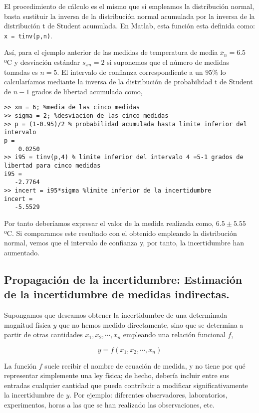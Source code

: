 El procedimiento de cálculo es el mismo que si empleamos la distribución normal, basta sustituir la inversa de la distribución normal acumulada por la inversa de la distribución t de Student acumulada. En Matlab, esta función esta definida como: \texttt{x = tinv(p,n)}. 

Así, para el ejemplo anterior de las medidas de temperatura de media  $\bar{x}_n=6.5$ ºC y  desviación estándar $s_{xn}=2$  si suponemos que el número de medidas tomadas es $n=5$. El intervalo de confianza correspondiente a un $95\%$  lo calcularíamos mediante la inversa de la distribución de probabilidad t de Student de $n-1$ grados de libertad acumulada como,

\begin{verbatim}
>> xm = 6; %media de las cinco medidas
>> sigma = 2; %desviacion de las cinco medidas
>> p = (1-0.95)/2 % probabilidad acumulada hasta limite inferior del intervalo
p =
    0.0250
>> i95 = tinv(p,4) % limite inferior del intervalo 4 =5-1 grados de libertad para cinco medidas
i95 =
   -2.7764
>> incert = i95*sigma %limite inferior de la incertidumbre
incert =
   -5.5529
\end{verbatim}

Por tanto deberíamos expresar el valor de la medida realizada como, $6.5\pm 5.55$ ºC. Si comparamos este resultado con el obtenido empleando la distribución normal, vemos que el intervalo de confianza y, por tanto, la incertidumbre han aumentado.

\subsection{Propagación de la incertidumbre: Estimación de la incertidumbre de medidas indirectas.}

Supongamos que deseamos obtener la incertidumbre de una determinada magnitud física $y$ que no hemos medido directamente, sino que se determina a partir de otras cantidades $x_1,x_2,\cdots,x_n$ empleando una relación funcional $f$,

\begin{equation*}
y = f(x_1,x_2,\cdots,x_n)
\end{equation*}

La función $f$ suele recibir el nombre de ecuación de medida, y no tiene por qué representar simplemente una ley física; de hecho, debería incluir entre sus entradas cualquier cantidad que pueda contribuir a modificar significativamente la incertidumbre de $y$. Por ejemplo: diferentes observadores, laboratorios, experimentos, horas a las que se han realizado las observaciones, etc.


